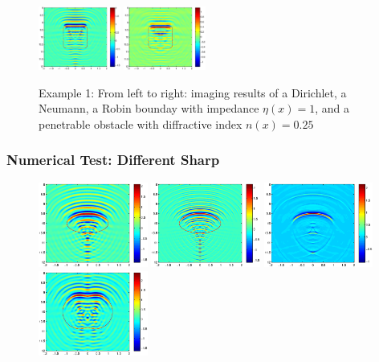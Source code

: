 \documentclass[cjk,8pt]{beamer}
\begin{document}
\begin{CJK*}{GBK}{kai}
\begin{frame}
\begin{figure}
 	\includegraphics[width=0.24\textwidth]{./graphic/rectangle_3pi_impedance_1.eps}
 	\includegraphics[width=0.24\textwidth]{./graphic/rectangle_3pi_transmission.eps}
 	\caption{Example 1: From left to right: imaging results of a Dirichlet, a Neumann, a Robin bounday with impedance $\eta(x)=1$, and a penetrable obstacle with diffractive index $n(x)=0.25$}
 \end{figure}
\end{frame}
\begin{frame}
\frametitle{Numerical Test: Different Sharp}
\begin{figure}[h]
	\centering
	\includegraphics[width=0.32\textwidth]{./graphic/circle_3pi.eps}
	\includegraphics[width=0.32\textwidth]{./graphic/circle_5pi.eps}
	\includegraphics[width=0.32\textwidth]{./graphic/circle.eps}\\
	\includegraphics[width=0.32\textwidth]{./graphic/peanut_3pi.eps}

\end{figure}
\end{frame}
\end{CJK*}
\end{document}
